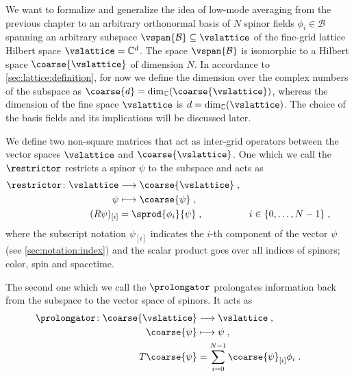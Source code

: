We want to formalize and generalize the idea of low-mode averaging from the previous chapter to an arbitrary orthonormal basis of $N$ spinor fields $\phi_{i} \in \mathcal{B}$ spanning an arbitrary subspace $\vspan{\mathcal{B}} \subseteq \vslattice$ of the fine-grid lattice Hilbert space $\vslattice = \mathbb{C}^d$.
The space $\vspan{\mathcal{B}}$ is isomorphic to a Hilbert space $\coarse{\vslattice}$ of dimension $N$.
In accordance to \cref{sec:lattice:definition}, for now we define the dimension over the complex numbers of the subspace as $\coarse{d} = \dim_{\mathbb{C}}(\coarse{\vslattice})$, whereas the dimension of the fine space $\vslattice$ is $d = \dim_{\mathbb{C}}(\vslattice)$.
The choice of the basis fields and its implications will be discussed later.

We define two non-square matrices that act as inter-grid operators between the vector spaces $\vslattice$ and $\coarse{\vslattice}$.
One which we call the  $\restrictor$ restricts a spinor $\psi$ to the subspace and acts as
\begin{align}
&\begin{aligned}
\restrictor \colon
\vslattice &\longrightarrow \coarse{\vslattice} \;, \\
\psi       &\longmapsto     \coarse{\psi} \;, \\
(R \psi)_{[i]} &= \sprod{\phi_{i}}{\psi} \;,
& i &\in \{ 0, \ldots, N-1 \} \;,
\end{aligned} \label{eq:R}
\end{align}
where the subscript notation $\psi_{[i]}$ indicates the $i$-th component of the vector $\psi$ (see \cref{sec:notation:index}) and the scalar product goes over all indices of spinors; color, spin and spacetime.

The second one which we call the  $\prolongator$ prolongates information back from the subspace to the vector space of spinors.
It acts as
\begin{align}
&\begin{aligned}
\prolongator \colon
\coarse{\vslattice}  &\longrightarrow \vslattice \;, \\
\coarse{\psi}        &\longmapsto     \psi \;, \\
T \coarse{\psi} &= \sum_{i=0}^{N-1} \coarse{\psi}_{[i]} \phi_{i} \;. &
\end{aligned} \label{eq:T}
\end{align}

